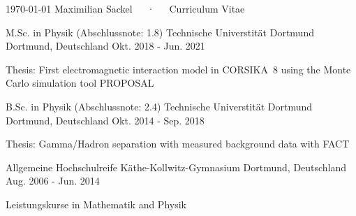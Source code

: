 \documentclass[11pt, a4paper]{Awesome-CV/awesome-cv}
\begin{document}
\makecvheader

\makecvfooter
{\today}
{Maximilian Sackel~~~·~~~Curriculum Vitae}
{\thepage}




\begin{cventries}
    \cventry
    {M.Sc. in Physik \quad (Abschlussnote: 1.8)} %
    {Technische Universtität Dortmund} %
    {Dortmund, Deutschland} %
    {Okt. 2018 - Jun. 2021} %
    {
        \begin{cvitems} %
        \item {Thesis: First electromagnetic interaction model in CORSIKA~8 using the Monte Carlo simulation tool PROPOSAL}
        \end{cvitems}
    }%

    \cventry
    {B.Sc. in Physik \quad (Abschlussnote: 2.4)} %
    {Technische Universtität Dortmund} %
    {Dortmund, Deutschland} %
    {Okt. 2014 - Sep. 2018} %
    {
        \begin{cvitems} %
        \item {Thesis: Gamma/Hadron separation with measured background data with FACT}
        \end{cvitems}
    }%

    \cventry
    {Allgemeine Hochschulreife} %
    {Käthe-Kollwitz-Gymnasium} %
    {Dortmund, Deutschland} %
    {Aug. 2006 - Jun. 2014} %
    {
        \begin{cvitems} %
        \item {Leistungskurse in Mathematik and Physik}
        \end{cvitems}
    }%
\end{cventries}
\end{document}

